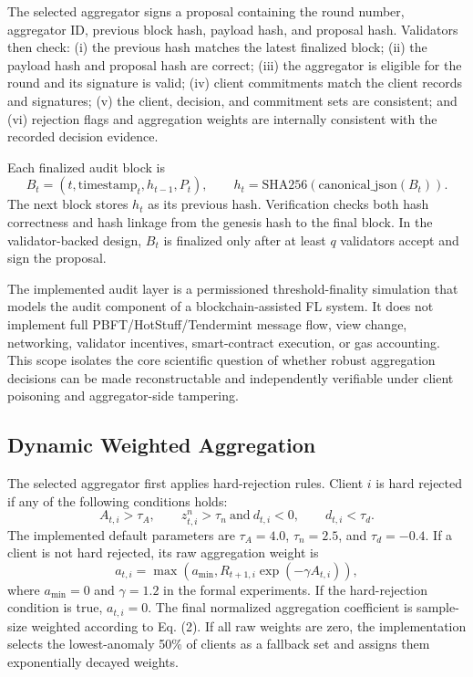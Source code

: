 \documentclass[preprint,authoryear,12pt]{elsarticle}
\begin{document}
The selected aggregator signs a proposal containing the round number, aggregator ID, previous block hash, payload hash, and proposal hash. Validators then check: (i) the previous hash matches the latest finalized block; (ii) the payload hash and proposal hash are correct; (iii) the aggregator is eligible for the round and its signature is valid; (iv) client commitments match the client records and signatures; (v) the client, decision, and commitment sets are consistent; and (vi) rejection flags and aggregation weights are internally consistent with the recorded decision evidence.

Each finalized audit block is
\begin{equation}
B_t=(t,\mathrm{timestamp}_t,h_{t-1},P_t), \qquad
h_t=\mathrm{SHA256}(\mathrm{canonical\_json}(B_t)).
\end{equation}
The next block stores $h_t$ as its previous hash. Verification checks both hash correctness and hash linkage from the genesis hash to the final block. In the validator-backed design, $B_t$ is finalized only after at least $q$ validators accept and sign the proposal.

The implemented audit layer is a permissioned threshold-finality simulation that models the audit component of a blockchain-assisted FL system. It does not implement full PBFT/HotStuff/Tendermint message flow, view change, networking, validator incentives, smart-contract execution, or gas accounting. This scope isolates the core scientific question of whether robust aggregation decisions can be made reconstructable and independently verifiable under client poisoning and aggregator-side tampering.

\subsection{Dynamic Weighted Aggregation}

The selected aggregator first applies hard-rejection rules. Client $i$ is hard rejected if any of the following conditions holds:
\begin{equation}
A_{t,i}>\tau_A,\qquad
z^n_{t,i}>\tau_n \ \mathrm{and}\ d_{t,i}<0,\qquad
d_{t,i}<\tau_d.
\end{equation}
The implemented default parameters are $\tau_A=4.0$, $\tau_n=2.5$, and $\tau_d=-0.4$. If a client is not hard rejected, its raw aggregation weight is
\begin{equation}
a_{t,i}=\max(a_{\min},R_{t+1,i}\exp(-\gamma A_{t,i})),
\end{equation}
where $a_{\min}=0$ and $\gamma=1.2$ in the formal experiments. If the hard-rejection condition is true, $a_{t,i}=0$. The final normalized aggregation coefficient is sample-size weighted according to Eq. (2). If all raw weights are zero, the implementation selects the lowest-anomaly 50\% of clients as a fallback set and assigns them exponentially decayed weights.
\end{document}
